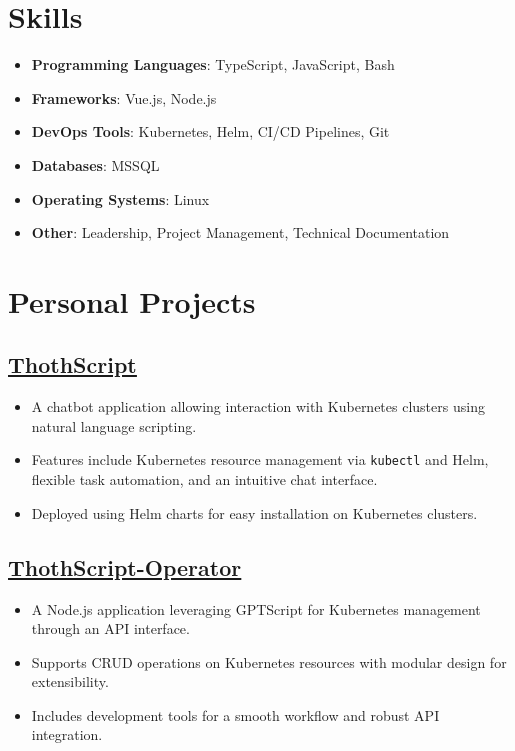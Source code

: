 \documentclass[a4paper,10pt]{article}
\begin{document}
\section*{Skills}
\begin{itemize}[leftmargin=1.5em]
    \item \textbf{Programming Languages}: TypeScript, JavaScript, Bash
    \item \textbf{Frameworks}: Vue.js, Node.js
    \item \textbf{DevOps Tools}: Kubernetes, Helm, CI/CD Pipelines, Git
    \item \textbf{Databases}: MSSQL
    \item \textbf{Operating Systems}: Linux
    \item \textbf{Other}: Leadership, Project Management, Technical Documentation
\end{itemize}

\section*{Personal Projects}

\subsection*{\href{https://github.com/jordojordo/thothscript}{\underline{ThothScript}}}
\begin{itemize}[leftmargin=1.5em]
    \item A chatbot application allowing interaction with Kubernetes clusters using natural language scripting.
    \item Features include Kubernetes resource management via \texttt{kubectl} and Helm, flexible task automation, and an intuitive chat interface.
    \item Deployed using Helm charts for easy installation on Kubernetes clusters.
\end{itemize}

\subsection*{\href{https://github.com/jordojordo/thothscript-operator}{\underline{ThothScript-Operator}}}
\begin{itemize}[leftmargin=1.5em]
    \item A Node.js application leveraging GPTScript for Kubernetes management through an API interface.
    \item Supports CRUD operations on Kubernetes resources with modular design for extensibility.
    \item Includes development tools for a smooth workflow and robust API integration.
\end{itemize}
\end{document}
